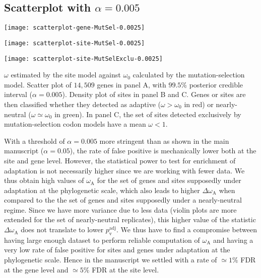 \documentclass{article}
\renewcommand*{\bm}[1]{#1}%
\newcommand{\rateApop}{\omega_{\mathrm{A}}}
\begin{document}
    \subsection{Scatterplot with $\bm{\alpha=0.005}$}

    \begin{center}
        \begin{minipage}{0.32\linewidth}
            \texttt{[image: scatterplot-gene-MutSel-0.0025]}
        \end{minipage}
        \hfill
        \begin{minipage}{0.32\linewidth}
            \texttt{[image: scatterplot-site-MutSel-0.0025]}
        \end{minipage}
        \hfill
        \begin{minipage}{0.32\linewidth}
            \texttt{[image: scatterplot-site-MutSelExclu-0.0025]}
        \end{minipage}
        \hfill
    \end{center}

    $\omega$ estimated by the site model against $\omega_{0}$ calculated by the mutation-selection model.
    Scatter plot of $14,509$ genes in panel A, with $99.5$\% posterior credible interval ($\alpha=0.005$).
    Density plot of sites in panel B and C.
    Genes or sites are then classified whether they detected as adaptive ($\omega > \omega_{0}$ in red) or nearly-neutral ($\omega \simeq \omega_{0}$ in green).
    In panel C, the set of sites detected exclusively by mutation-selection codon models have a mean $\omega < 1 $.

    \newpage
    

    With a threshold of $\alpha=0.005$ more stringent than as shown in the main manuscript ($\alpha=0.05$), the rate of false positive is mechanically lower both at the site and gene level.
    However, the statistical power to test for enrichment of adaptation is not necessarily higher since we are working with fewer data.
    We thus obtain high values of $\rateApop$ for the set of genes and sites supposedly under adaptation at the phylogenetic scale, which also leads to higher $\Delta \rateApop$ when compared to the the set of genes and sites supposedly under a nearly-neutral regime.
    Since we have more variance due to less data (violin plots are more extended for the set of nearly-neutral replicates), this higher value of the statistic $\Delta \rateApop$
    does not translate to lower $p_{\mathrm{v}}^{\mathrm{adj}}$.
    We thus have to find a compromise between having large enough dataset to perform reliable computation of $\rateApop$ and having a very low rate of false positive for sites and genes under adaptation at the phylogenetic scale.
    Hence in the manuscript we settled with a rate of $\simeq 1 \%$ FDR at the gene level and $\simeq 5 \%$ FDR at the site level.
\end{document}
